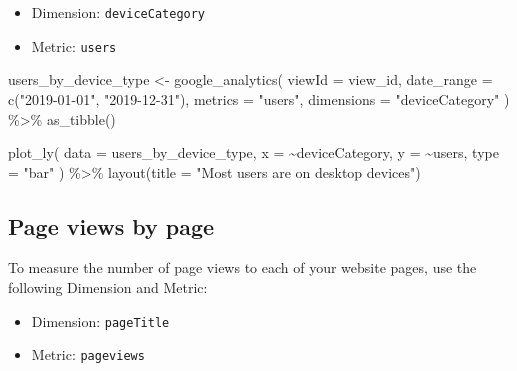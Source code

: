 \documentclass[
]{book}
\newenvironment{Shaded}{\begin{snugshade}}{\end{snugshade}}
\newcommand{\AttributeTok}[1]{\textcolor[rgb]{0.77,0.63,0.00}{#1}}
\newcommand{\FunctionTok}[1]{\textcolor[rgb]{0.00,0.00,0.00}{#1}}
\newcommand{\NormalTok}[1]{#1}
\newcommand{\OtherTok}[1]{\textcolor[rgb]{0.56,0.35,0.01}{#1}}
\newcommand{\SpecialCharTok}[1]{\textcolor[rgb]{0.00,0.00,0.00}{#1}}
\newcommand{\StringTok}[1]{\textcolor[rgb]{0.31,0.60,0.02}{#1}}
\providecommand{\tightlist}{%
  \setlength{\itemsep}{0pt}\setlength{\parskip}{0pt}}
\begin{document}
\begin{itemize}
\tightlist
\item
  Dimension: \texttt{deviceCategory}
\item
  Metric: \texttt{users}
\end{itemize}

\begin{Shaded}
\begin{Highlighting}[]
\NormalTok{users\_by\_device\_type }\OtherTok{\textless{}{-}} \FunctionTok{google\_analytics}\NormalTok{(}
  \AttributeTok{viewId =}\NormalTok{ view\_id,}
  \AttributeTok{date\_range =} \FunctionTok{c}\NormalTok{(}\StringTok{"2019{-}01{-}01"}\NormalTok{, }\StringTok{"2019{-}12{-}31"}\NormalTok{),}
  \AttributeTok{metrics =} \StringTok{"users"}\NormalTok{,}
  \AttributeTok{dimensions =} \StringTok{"deviceCategory"}
\NormalTok{) }\SpecialCharTok{\%\textgreater{}\%}
  \FunctionTok{as\_tibble}\NormalTok{()}

\FunctionTok{plot\_ly}\NormalTok{(}
  \AttributeTok{data =}\NormalTok{ users\_by\_device\_type,}
  \AttributeTok{x =} \SpecialCharTok{\textasciitilde{}}\NormalTok{deviceCategory,}
  \AttributeTok{y =} \SpecialCharTok{\textasciitilde{}}\NormalTok{users,}
  \AttributeTok{type =} \StringTok{"bar"}
\NormalTok{) }\SpecialCharTok{\%\textgreater{}\%}
  \FunctionTok{layout}\NormalTok{(}\AttributeTok{title =} \StringTok{"Most users are on desktop devices"}\NormalTok{)}
\end{Highlighting}
\end{Shaded}

\hypertarget{page-views-by-page}{%
\subsection{Page views by page}\label{page-views-by-page}}

To measure the number of page views to each of your website pages, use the following Dimension and Metric:

\begin{itemize}
\tightlist
\item
  Dimension: \texttt{pageTitle}
\item
  Metric: \texttt{pageviews}
\end{itemize}
\end{document}
